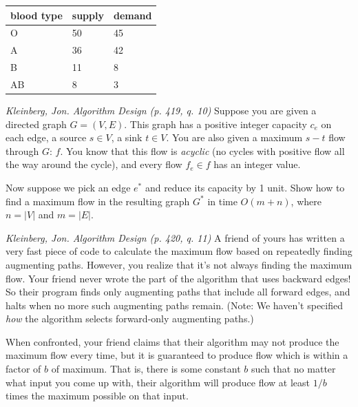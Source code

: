 \documentclass[solutionorbox,answers]{exam} %
\begin{document}
\begin{questions}
\begin{parts}
\begin{tabular}{lll}
blood type & supply & demand \\
\hline
O & 50 & 45 \\
A & 36 & 42 \\
B & 11 & 8 \\
AB & 8 & 3
\end{tabular}

\begin{solutionbox}{2in}


\end{solutionbox}

\end{parts}

\newpage

\question
\emph{Kleinberg, Jon. Algorithm Design (p. 419, q. 10)}
Suppose you are given a directed graph $G=(V,E)$. This graph has a positive integer capacity $c_e$ on each edge, a source $s\in V$, a sink $t\in V$. You are also given a maximum $s-t$ flow through $G$: $f$. You know that this flow is \emph{acyclic} (no cycles with positive flow all the way around the cycle), and every flow $f_e\in f$ has an integer value.

Now suppose we pick an edge $e^*$ and reduce its capacity by 1 unit. Show how to find a maximum flow in the resulting graph $G^*$ in time $O(m+n)$, where $n=|V|$ and $m=|E|$.
\begin{solutionbox}{2in}


\end{solutionbox}

\question
\emph{Kleinberg, Jon. Algorithm Design (p. 420, q. 11)}
A friend of yours has written a very fast piece of code to calculate the maximum flow based on repeatedly finding augmenting paths. However, you realize that it's not always finding the maximum flow. Your friend never wrote the part of the algorithm that uses backward edges! So their program finds only augmenting paths that include all forward edges, and halts when no more such augmenting paths remain. (Note: We haven't specified \emph{how} the algorithm selects forward-only augmenting paths.)

When confronted, your friend claims that their algorithm may not produce the maximum flow every time, but it is guaranteed to produce flow which is within a factor of $b$ of maximum. That is, there is some constant $b$ such that no matter what input you come up with, their algorithm will produce flow at least $1/b$ times the maximum possible on that input.


\end{questions}
\end{document}
